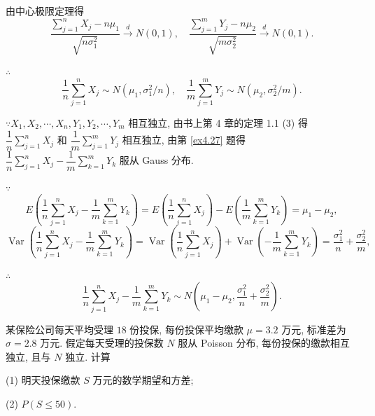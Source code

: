 \documentclass[color=black,device=normal,lang=cn]{elegantnote}
\numberwithin{equation}{section}
\theoremstyle{plain}
\numberwithin{exercise}{exsection}
\begin{document}
\begin{solution}
    由中心极限定理得
    \[\dfrac{\sum\limits_{j=1}^nX_j-n\mu_1}{\sqrt{n\sigma_1^2}}\xrightarrow{d}N(0,1),\quad\dfrac{\sum\limits_{j=1}^mY_j-n\mu_2}{\sqrt{m\sigma_2^2}}\xrightarrow{d}N(0,1).\]

    $\therefore$
    \[\dfrac{1}{n}\sum\limits_{j=1}^nX_j\sim N(\mu_1,\sigma^2_1/n),\quad\dfrac{1}{m}\sum\limits_{j=1}^mY_j\sim N(\mu_2,\sigma_2^2/m).\]

    $\because X_1,X_2,\cdots,X_n,Y_1,Y_2,\cdots,Y_m$ 相互独立, 由书上第 4 章的定理 1.1 (3) 得 $\dfrac{1}{n}\sum\limits_{j=1}^nX_j$ 和 $\dfrac{1}{m}\sum\limits_{j=1}^mY_j$ 相互独立, 由第 \ref{ex4.27} 题得 $\dfrac{1}{n}\sum\limits_{j=1}^nX_j-\dfrac{1}{m}\sum\limits_{k=1}^mY_k$ 服从 Gauss 分布.

    $\because$
    \[E\left(\dfrac{1}{n}\sum\limits_{j=1}^nX_j-\dfrac{1}{m}\sum\limits_{k=1}^mY_k\right)=E\left(\dfrac{1}{n}\sum\limits_{j=1}^nX_j\right)-E\left(\dfrac{1}{m}\sum\limits_{k=1}^mY_k\right)=\mu_1-\mu_2,\]
    \[\operatorname{Var}\left(\dfrac{1}{n}\sum\limits_{j=1}^nX_j-\dfrac{1}{m}\sum\limits_{k=1}^mY_k\right)=\operatorname{Var}\left(\dfrac{1}{n}\sum\limits_{j=1}^nX_j\right)+\operatorname{Var}\left(-\dfrac{1}{m}\sum\limits_{k=1}^mY_k\right)=\dfrac{\sigma_1^2}{n}+\dfrac{\sigma_2^2}{m},\]

    $\therefore$
    \[\dfrac{1}{n}\sum\limits_{j=1}^nX_j-\dfrac{1}{m}\sum\limits_{k=1}^mY_k\sim N\left(\mu_1-\mu_2,\dfrac{\sigma_1^2}{n}+\dfrac{\sigma_2^2}{m}\right).\]
\end{solution}
\begin{exercise}%
    某保险公司每天平均受理 $18$ 份投保, 每份投保平均缴款 $\mu=3.2$ 万元, 标准差为 $\sigma=2.8$ 万元. 假定每天受理的投保数 $N$ 服从 Poisson 分布, 每份投保的缴款相互独立, 且与 $N$ 独立. 计算

    (1) 明天投保缴款 $S$ 万元的数学期望和方差;

    (2) $P(S\leq50)$.
\end{exercise}
\end{document}
